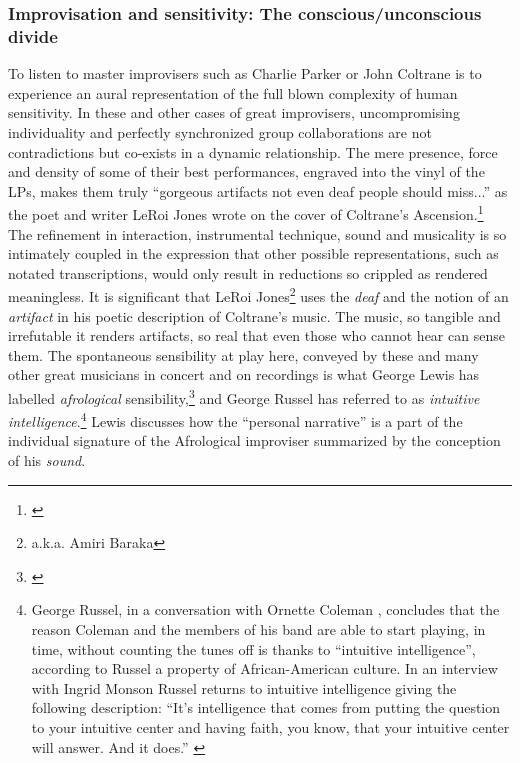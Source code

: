 \subsubsection*{Improvisation and sensitivity: The
  conscious/unconscious divide}
\label{sec:impr-sens}

To listen to master improvisers such as Charlie Parker or John
Coltrane is to experience an aural representation of the full blown
complexity of human sensitivity. In these and other cases of great improvisers,
uncompromising individuality and perfectly synchronized group
collaborations are not contradictions but co-exists in a dynamic
relationship. The mere presence, force and density of some of their
best performances, engraved into the vinyl of the LPs, makes them truly
``gorgeous artifacts not even deaf people should miss...'' as the poet
and writer LeRoi Jones wrote on the cover of Coltrane's
Ascension.\footnote{\citet{leroi65}} The refinement in interaction,
instrumental technique, sound and musicality is so intimately coupled
in the expression that other possible representations, such as notated
transcriptions, would only result in reductions so crippled as
rendered meaningless. It is significant that LeRoi
Jones\footnote{a.k.a. Amiri Baraka} uses the \emph{deaf} and the
notion of an \emph{artifact} in his poetic description of Coltrane's
music. The music, so tangible and irrefutable it renders artifacts, so
real that even those who cannot hear can sense them. The spontaneous
sensibility at play here, conveyed by these and many other great
musicians in concert and on recordings is what George Lewis has
labelled \emph{afrological} sensibility,\footnote{\citet{lewis-1}} and George
Russel has referred to as \emph{intuitive
  intelligence}.\footnote{George Russel, in a conversation with
  Ornette Coleman \citep[see][]{ornette85}, concludes that the reason
  Coleman and the members of his band are able to start playing, in
  time, without counting the tunes off is thanks to ``intuitive
  intelligence'', according to Russel a property of African-American
  culture. In an interview with Ingrid Monson Russel returns to
  intuitive intelligence giving the following description: ``It's
  intelligence that comes from putting the question to your intuitive
  center and having faith, you know, that your intuitive center will
  answer. And it does.'' \cite[George Russel quoted
  in][p. 154]{monson98}} Lewis discusses how the ``personal narrative''
is a part of the individual signature of the Afrological improviser
summarized by the conception of his \emph{sound}.
